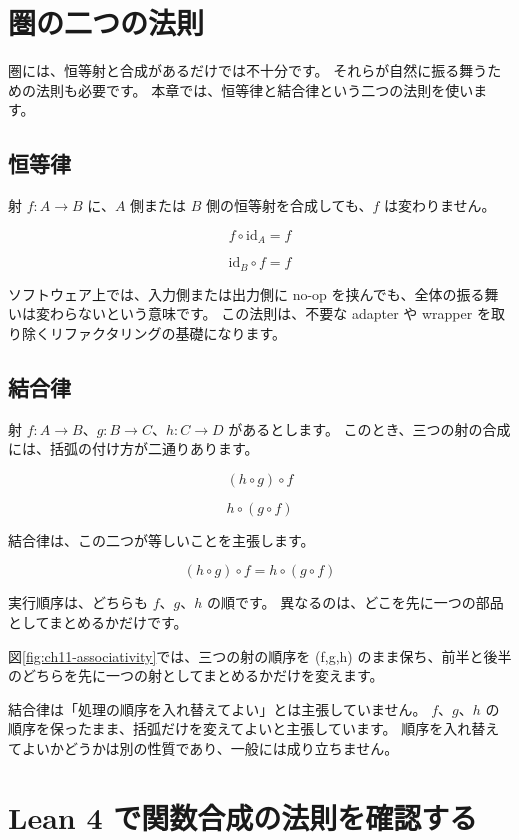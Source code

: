 \section{圏の二つの法則}

圏には、恒等射と合成があるだけでは不十分です。
それらが自然に振る舞うための法則も必要です。
本章では、恒等律と結合律という二つの法則を使います。

\subsection{恒等律}

射 \(f : A \to B\) に、\(A\) 側または \(B\) 側の恒等射を合成しても、\(f\) は変わりません。

\[
  f \circ \mathrm{id}_A = f
\]

\[
  \mathrm{id}_B \circ f = f
\]

ソフトウェア上では、入力側または出力側に no-op を挟んでも、全体の振る舞いは変わらないという意味です。
この法則は、不要な adapter や wrapper を取り除くリファクタリングの基礎になります。

\subsection{結合律}

射 \(f : A \to B\)、\(g : B \to C\)、\(h : C \to D\) があるとします。
このとき、三つの射の合成には、括弧の付け方が二通りあります。

\[
  (h \circ g) \circ f
\]

\[
  h \circ (g \circ f)
\]

結合律は、この二つが等しいことを主張します。

\[
  (h \circ g) \circ f = h \circ (g \circ f)
\]

実行順序は、どちらも \(f\)、\(g\)、\(h\) の順です。
異なるのは、どこを先に一つの部品としてまとめるかだけです。

図\ref{fig:ch11-associativity}では、三つの射の順序を (f,g,h) のまま保ち、前半と後半のどちらを先に一つの射としてまとめるかだけを変えます。


結合律は「処理の順序を入れ替えてよい」とは主張していません。
\(f\)、\(g\)、\(h\) の順序を保ったまま、括弧だけを変えてよいと主張しています。
順序を入れ替えてよいかどうかは別の性質であり、一般には成り立ちません。

\section{Lean 4 で関数合成の法則を確認する}


